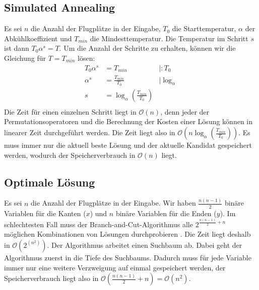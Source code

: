 \documentclass[a4paper,10pt,ngerman]{scrartcl}
\begin{document}
\subsection{Simulated Annealing}
Es sei $n$ die Anzahl der Flugplätze in der Eingabe, $T_0$ die Starttemperatur,
$\alpha$ der Abkühlkoeffizient und $T_{min}$ die Mindesttemperatur. Die
Temperatur im Schritt $s$ ist dann $T_0\alpha^s=T$. Um die Anzahl der Schritte
zu erhalten, können wir die Gleichung für $T=T_{min}$ lösen:
\begin{align*}
  T_0\alpha^s & = T_{min}                            & |:T_0          \\
  \alpha^s    & = \frac{T_{min}}{T_0}                & |\log_{\alpha} \\
  s           & = \log_{\alpha}(\frac{T_{min}}{T_0})                  \\
\end{align*}
Die Zeit für einen einzelnen Schritt liegt in $\mathcal{O}(n)$, denn jeder der Permutationsoperatoren
und die Berechnung der Kosten einer Lösung können in linearer Zeit durchgeführt werden. Die Zeit liegt also in
$\mathcal{O}(n\log_{\alpha}(\frac{T_{min}}{T_0}))$. Es muss immer nur die aktuell beste Lösung und der aktuelle Kandidat
gespeichert werden, wodurch der Speicherverbrauch in $\mathcal{O}(n)$ liegt.
\subsection{Optimale Lösung}
Es sei $n$ die Anzahl der Flugplätze in der Eingabe. Wir haben
$\frac{n(n-1)}{2}$ binäre Variablen für die Kanten ($x$) und $n$ binäre
Variablen für die Enden ($y$). Im schlechtesten Fall muss der
Branch-and-Cut-Algorithmus alle $2^{\frac{n(n-1)}{2}+n}$ möglichen
Kombinationen von Lösungen durchprobieren \cite[653]{korte_2018}. Die Zeit
liegt deshalb in $\mathcal{O}(2^(n^2))$. Der Algorithmus arbeitet einen
Suchbaum ab. Dabei geht der Algorithmus zuerst in die Tiefe des Suchbaums.
Dadurch muss für jede Variable immer nur eine weitere Verzweigung auf einmal
gespeichert werden, der Speicherverbrauch liegt also in
$\mathcal{O}(\frac{n(n-1)}{2}+n) = \mathcal{O}(n^2)$.
\end{document}
